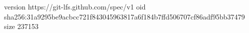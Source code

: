 version https://git-lfs.github.com/spec/v1
oid sha256:31a9295be9acbcc721f843045963817a6f184b7ffd506707cf86adf95bb37479
size 237153
